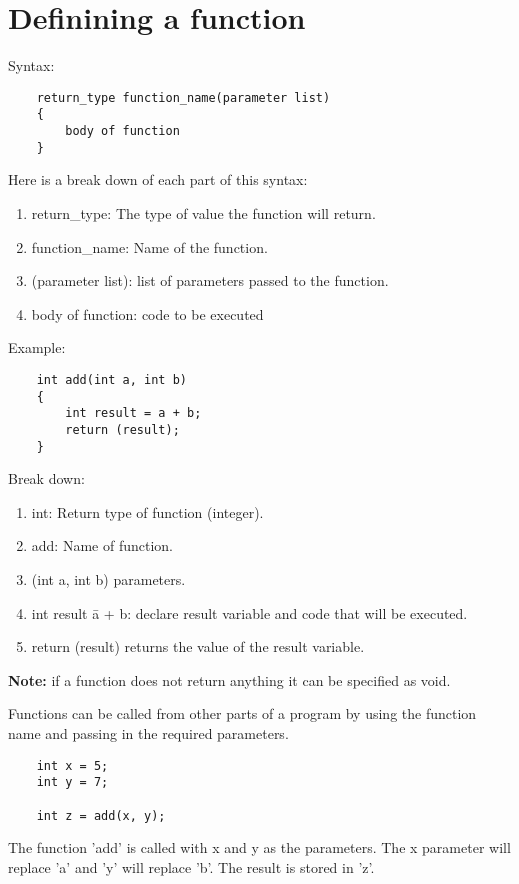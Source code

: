 \documentclass[
	12pt, %
]{fphw}
\begin{document}
\section*{Definining a function}

Syntax:
\begin{lstlisting}
	return_type function_name(parameter list)
	{
		body of function
	}
\end{lstlisting}

Here is a break down of each part of this syntax:

\begin{enumerate}
	\item return\_type: The type of value the function will return.
	\item function\_name: Name of the function.
	\item (parameter list): list of parameters passed to the function.
	\item body of function: code to be executed
\end{enumerate}

Example:
\begin{lstlisting}
	int add(int a, int b)
	{
		int result = a + b;
		return (result);
	}
\end{lstlisting}
 
Break down:
\begin{enumerate}
	\item int: Return type of function (integer).
	\item add: Name of function.
	\item (int a, int b)\: parameters.
	\item int result \= a + b: declare result variable and code that will be executed.
	\item return (result)\: returns the value of the result variable.
\end{enumerate}

\textbf{Note:} if a function does not return anything it can be specified as void.

Functions can be called from other parts of a program by using the function name 
and passing in the required parameters.

\begin{lstlisting}
	int x = 5;
	int y = 7;

	int z = add(x, y);
\end{lstlisting}
The function 'add' is called with x and y as the parameters. The x parameter 
will replace 'a' and 'y' will replace 'b'. The result is stored in 'z'.
\end{document}
